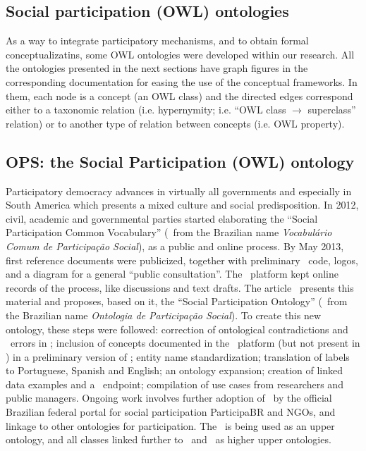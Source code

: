 \begin{apendicesenv}
\section{Social participation (OWL) ontologies}\label{sec:spont}
As a way to integrate participatory mechanisms, and to obtain formal conceptualizatins,
some OWL ontologies were developed within our research.
All the ontologies presented in the next sections have graph figures in the corresponding documentation for easing the use of
the conceptual frameworks.
In them, each node is a concept (an OWL class) and the directed edges correspond either to a taxonomic relation
(i.e. hypernymity; i.e. ``OWL class $\rightarrow$ superclass'' relation) or to another type of relation between concepts (i.e. OWL property).

\subsection{OPS: the Social Participation (OWL) ontology}
Participatory democracy advances in virtually all governments and especially in South America which presents a mixed culture and social predisposition.
 In 2012, civil, academic and governmental parties started elaborating the ``Social Participation Common Vocabulary'' (\vcps\ from the Brazilian name \emph{Vocabul\'ario Comum de Participa\c{c}\~ao Social}), as a public and online process. By May 2013, first reference documents were publicized, together with preliminary \owl\ code, logos, and a diagram for a general ``public consultation''.
The \corais\ platform kept online records of the process, like discussions and text drafts. 
The article~\cite{ops} presents this material and proposes, based on it, the ``Social Participation Ontology'' (\ops\ from the Brazilian name \emph{Ontologia de Participa\c{c}\~ao Social}). To create  this new ontology, these steps were followed: correction of ontological contradictions and \owl\ errors in \vcps; inclusion of concepts documented in the \corais\ platform (but not present in \vcps) in a preliminary version of \ops; entity name standardization; translation of labels to Portuguese, Spanish and English; an ontology expansion; creation of linked data examples and  a \sparql\ endpoint; compilation of use cases from researchers and public managers.
Ongoing work involves further adoption of \ops\ by the official Brazilian federal portal for social participation ParticipaBR and NGOs,
and linkage to other ontologies for participation. The \ops\ is being used as an upper ontology, and all classes linked further to \foaf\ and \bfo\ as higher upper ontologies.


\end{apendicesenv}
